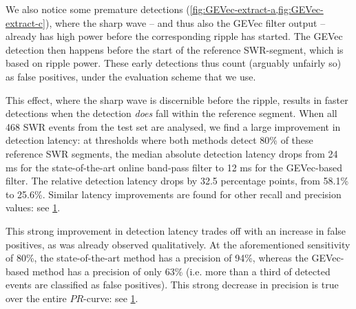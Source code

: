 We also notice some premature detections (\cref{fig:GEVec-extract-a,fig:GEVec-extract-c}), where the sharp wave -- and thus also the GEVec filter output -- already has high power before the corresponding ripple has started. The GEVec detection then happens before the start of the reference SWR-segment, which is based on ripple power. These early detections thus count (arguably unfairly so) as false positives, under the evaluation scheme that we use.

\begin{figure}
\label{fig:LSM-PR-and-latency}
\end{figure}

This effect, where the sharp wave is discernible before the ripple, results in faster detections when the detection \emph{does} fall within the reference segment. When all 468 SWR events from the test set are analysed, we find a large improvement in detection latency: at thresholds where both methods detect 80\% of these reference SWR segments, the median absolute detection latency drops from 24 ms for the state-of-the-art online band-pass filter to 12 ms for the GEVec-based filter. The relative detection latency drops by 32.5 percentage points, from 58.1\% to 25.6\%. Similar latency improvements are found for other recall and precision values: see \cref{fig:LSM-PR-and-latency}.

This strong improvement in detection latency trades off with an increase in false positives, as was already observed qualitatively. At the aforementioned sensitivity of 80\%, the state-of-the-art method has a precision of 94\%, whereas the GEVec-based method has a precision of only 63\% (i.e. more than a third of detected events are classified as false positives). This strong decrease in precision is true over the entire $PR$-curve: see \cref{fig:LSM-PR-and-latency}.
